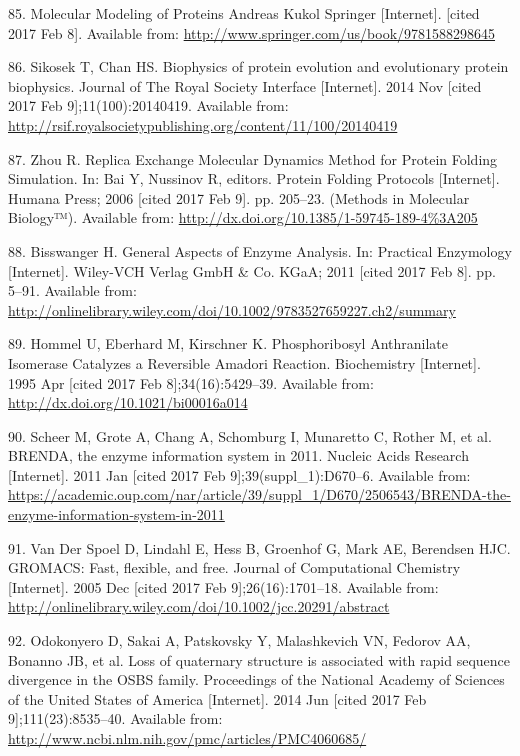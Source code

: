 \documentclass[12pt,twoside]{reedthesis}
\begin{document}
  \hypertarget{ref-kukol_molecular_2008}{}
  85. Molecular Modeling of Proteins Andreas Kukol Springer
  {[}Internet{]}. {[}cited 2017 Feb 8{]}. Available from:
  \url{http://www.springer.com/us/book/9781588298645}
  
  \hypertarget{ref-sikosek_biophysics_2014}{}
  86. Sikosek T, Chan HS. Biophysics of protein evolution and evolutionary
  protein biophysics. Journal of The Royal Society Interface
  {[}Internet{]}. 2014 Nov {[}cited 2017 Feb 9{]};11(100):20140419.
  Available from:
  \url{http://rsif.royalsocietypublishing.org/content/11/100/20140419}
  
  \hypertarget{ref-bai_replica_2006}{}
  87. Zhou R. Replica Exchange Molecular Dynamics Method for Protein
  Folding Simulation. In: Bai Y, Nussinov R, editors. Protein Folding
  Protocols {[}Internet{]}. Humana Press; 2006 {[}cited 2017 Feb 9{]}. pp.
  205--23. (Methods in Molecular Biology™). Available from:
  \url{http://dx.doi.org/10.1385/1-59745-189-4\%3A205}
  
  \hypertarget{ref-bisswanger_general_2011}{}
  88. Bisswanger H. General Aspects of Enzyme Analysis. In: Practical
  Enzymology {[}Internet{]}. Wiley-VCH Verlag GmbH \& Co. KGaA; 2011
  {[}cited 2017 Feb 8{]}. pp. 5--91. Available from:
  \url{http://onlinelibrary.wiley.com/doi/10.1002/9783527659227.ch2/summary}
  
  \hypertarget{ref-hommel_phosphoribosyl_1995}{}
  89. Hommel U, Eberhard M, Kirschner K. Phosphoribosyl Anthranilate
  Isomerase Catalyzes a Reversible Amadori Reaction. Biochemistry
  {[}Internet{]}. 1995 Apr {[}cited 2017 Feb 8{]};34(16):5429--39.
  Available from: \url{http://dx.doi.org/10.1021/bi00016a014}
  
  \hypertarget{ref-scheer_brenda_2011}{}
  90. Scheer M, Grote A, Chang A, Schomburg I, Munaretto C, Rother M, et
  al. BRENDA, the enzyme information system in 2011. Nucleic Acids
  Research {[}Internet{]}. 2011 Jan {[}cited 2017 Feb
  9{]};39(suppl\_1):D670--6. Available from:
  \url{https://academic.oup.com/nar/article/39/suppl_1/D670/2506543/BRENDA-the-enzyme-information-system-in-2011}
  
  \hypertarget{ref-van_der_spoel_gromacs_2005}{}
  91. Van Der Spoel D, Lindahl E, Hess B, Groenhof G, Mark AE, Berendsen
  HJC. GROMACS: Fast, flexible, and free. Journal of Computational
  Chemistry {[}Internet{]}. 2005 Dec {[}cited 2017 Feb
  9{]};26(16):1701--18. Available from:
  \url{http://onlinelibrary.wiley.com/doi/10.1002/jcc.20291/abstract}
  
  \hypertarget{ref-odokonyero_loss_2014}{}
  92. Odokonyero D, Sakai A, Patskovsky Y, Malashkevich VN, Fedorov AA,
  Bonanno JB, et al. Loss of quaternary structure is associated with rapid
  sequence divergence in the OSBS family. Proceedings of the National
  Academy of Sciences of the United States of America {[}Internet{]}. 2014
  Jun {[}cited 2017 Feb 9{]};111(23):8535--40. Available from:
  \url{http://www.ncbi.nlm.nih.gov/pmc/articles/PMC4060685/}
  
\end{document}
